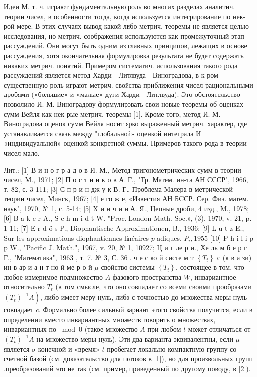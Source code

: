 \documentclass[10pt]{article}
\begin{document}
Идеи М. т. ч. играют фундаментальную роль во многих разделах аналитич. теории чисел, в особенности тогда, когда используется интегрирование по нек-рой мере. В этих случаях вывод какой-либо метрич. теоремы не является целью исследования, но метрич. соображения используются как промежуточный этап рассуждений. Они могут быть одним из главных принципов, лежащих в основе рассуждения, хотя окончательная формулировка результата не будет содержать никаких метрич. понятий. Примером систематич. использования такого рода рассуждений является метод Харди - Литлвуда - Виноградова, в к-ром существенную роль играют метрич. свойства приближения чисел рациональными дробями («большие» и «малые» дуги Харди - Литлвуда). Это обстоятельство позволило И. М. Виноградову формулировать свои новые теоремы об оценках сумм Вейля как нек-рые метрич. теоремы [1]. Кроме того, метод И. М. Виноградова оценок сумм Вейля носит ярко выраженный метрич. характер, где устанавливается связь между "глобальной» оценкой интеграла И «индивидуальной» оценкой конкретной суммы. Примеров такого рода в теории чисел мало.



Лит.: [1] В и н о г р а д о в И. М., Метод тригонометрических сумм в теории чисел, М., 1971; [2] П о с т н и к о в А. Г., "Тр. Матем. ин-та АН СССР", 1966, т. 82, с. 3-111; [3] С п р и н дж у к В. Г., Проблема Малера в метрической теории чисел, Минск, 1967; [4] е го ж е, «Известия АН БCСР. Сер. Физ. матем. наук", 1970, № 1, с. 5-14; [5] Х и н ч и н А. Я., Цепные дроби, 4 изд., M., 1978; [6] B a k e r A., S c h m i d t W. "Proc. London Math. Soc.», (3), 1970, v. 21, p. 1-11; [7] E r d ö s P., Diophantische Approximationen, B., 1936; [9] L u t z E., Sur les approximations diophantiennes linéaires $p$-adiques, $P_{i}, 1955$ [10] P h i l i p p W., "Pacific J. Math.", 1967, v. 20, № 1, 10927; Ц и г ле р и., Хе ль м б е р г Г., "Математика", 1963 , т. 7. № 3, С. 36 . ч е с ко й систе м т $\left\{T_{t}\right\}$ с (к в а зи) ин в ар и а н т но й ме р о й $\mu$-свойство системы $\left\{T_{t}\right\}$, состоящее в том, что любое измеримое подмножество $A$ фазового пространства $W$, инвариантное относительно $T_{t}$ (в том смысле, что оно совпадает со всеми своими прообразами $\left.\left(T_{t}\right)^{-1} A\right)$, либо имеет меру нуль, либо с точностью до множества меры нуль совпадает $c$. Формально более сильный вариант этого свойства получится, если в определении вместо инвариантных множеств говорить о множествах, инвариантных по $\bmod 0$ (такое множество $A$ при любом $t$ может отличаться от $\left(T_{t}\right)^{-1} A$ на множество меры нуль). Эти два варианта эквивалентны, если $\mu$ является $\sigma$-конечной и «время» $t$ пробегает локально компактную группу со счетной базой (см. доказательство для потоков в [1]), но для произвольных групп .преобразований это не так (см. пример, приведенный по другому поводу, в [2]).
\end{document}

